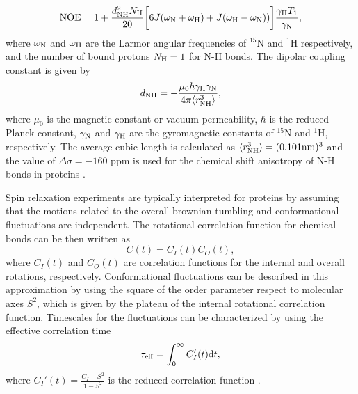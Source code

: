 \documentclass[journal=jpcbfk,manuscript=article]{achemso}
\begin{document}
\begin{equation}\label{NOE}
  {\rm NOE}=1+\frac{d_{\rm{NH}}^2N_{\rm{H}}}{20}\bigg[6J(\omega_{\rm{N}}+\omega_{\rm{H}})+J(\omega_{\rm{H}}-\omega_{\rm{N}}))\bigg]\frac{\gamma_{\rm{H}}T_1}{\gamma_{\rm{N}}},
\end{equation}
where $\omega_{\rm{N}}$ and $\omega_{\rm{H}}$ are the Larmor angular
frequencies of $^{15}$N and $^1$H respectively, and
the number of bound protons $N_{\rm{H}}=1$ for N-H bonds.
The dipolar coupling constant is given by
\begin{equation}
d_{\rm{NH}}=-\frac{\mu_0\hbar\gamma_{\rm{H}}\gamma_{\rm{N}}}{4\pi\langle r_{\rm{NH}}^3\rangle},\nonumber
\end{equation}
where $\mu_0$ is the magnetic constant or vacuum permeability, $\hbar$ is the reduced Planck constant,
$\gamma_{\rm{N}}$ and $\gamma_{\rm{H}}$ are the gyromagnetic constants of $^{15}$N and $^1$H, respectively.
The average cubic length is calculated as $\langle r_{\rm{NH}}^3\rangle = (0.101{\rm nm})^3$ and the 
value of $\Delta \sigma = -160$ ppm is used for the chemical shift anisotropy of N-H bonds in 
proteins \cite{kay89,hiyama88}.

Spin relaxation experiments are typically interpreted for proteins by
assuming that the motions related to the overall brownian tumbling 
and conformational fluctuations are independent.
The rotational correlation function for chemical bonds can be then written
as  \cite{wennerstrom79,Lipari82,jarymowycz06,korzhnev01,halle09}
\begin{equation}\label{CORRFsep}
  C(t)=C_I(t)C_O(t),
\end{equation}
where $C_I(t)$ and $C_O(t)$ are correlation functions for the internal and overall
rotations, respectively. Conformational fluctuations can be described
in this approximation by using the square of the order parameter respect to 
molecular axes $S^2$, which is given by the plateau of the internal rotational 
correlation function. Timescales for the fluctuations can be characterized by
using the effective correlation time 
\begin{equation}\label{effCT}
  \tau_{\rm eff}=\int_0^\infty C_I'(t) \mathrm{d}t,
\end{equation}
where $C_I'(t)=\frac{C_I-S^2}{1-S^2}$ is the reduced correlation function \cite{Lipari82}.
\end{document}
